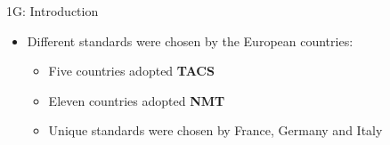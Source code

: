 \begin{frame}{1G: Introduction}
  \begin{itemize}  
    \item Different standards were chosen by the European countries\cite{FuMe2001}:
    \begin{itemize}
      \item Five countries adopted \textbf{TACS}
      \item Eleven countries adopted \textbf{NMT}
      \item Unique standards were chosen by France, Germany and Italy
    \end{itemize}
  \end{itemize}
\end{frame}
